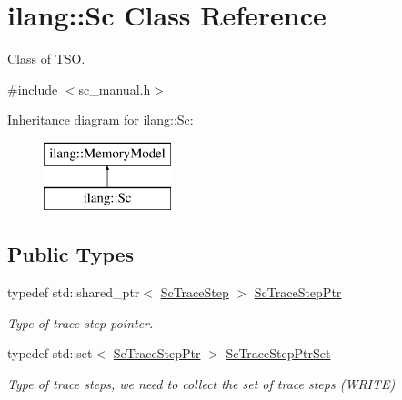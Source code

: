 \hypertarget{classilang_1_1_sc}{}\section{ilang\+:\+:Sc Class Reference}
\label{classilang_1_1_sc}


Class of T\+SO.  




{\ttfamily \#include $<$sc\+\_\+manual.\+h$>$}

Inheritance diagram for ilang\+:\+:Sc\+:\begin{figure}[H]
\begin{center}
\leavevmode
\includegraphics[height=2.000000cm]{classilang_1_1_sc}
\end{center}
\end{figure}
\subsection*{Public Types}
\begin{DoxyCompactItemize}
\item 
\mbox{\label{classilang_1_1_sc_ade832da72af6321617f30b8586b10bee}} 
typedef std\+::shared\+\_\+ptr$<$ \mbox{\hyperlink{classilang_1_1_sc_trace_step}{Sc\+Trace\+Step}} $>$ \mbox{\hyperlink{classilang_1_1_sc_ade832da72af6321617f30b8586b10bee}{Sc\+Trace\+Step\+Ptr}}
\begin{DoxyCompactList}\small\item\em Type of trace step pointer. \end{DoxyCompactList}\item 
\mbox{\label{classilang_1_1_sc_a04a7589572f6dcc3803375a35132ea01}} 
typedef std\+::set$<$ \mbox{\hyperlink{classilang_1_1_sc_ade832da72af6321617f30b8586b10bee}{Sc\+Trace\+Step\+Ptr}} $>$ \mbox{\hyperlink{classilang_1_1_sc_a04a7589572f6dcc3803375a35132ea01}{Sc\+Trace\+Step\+Ptr\+Set}}
\begin{DoxyCompactList}\small\item\em Type of trace steps, we need to collect the set of trace steps (W\+R\+I\+TE) \end{DoxyCompactList}\end{DoxyCompactItemize}
